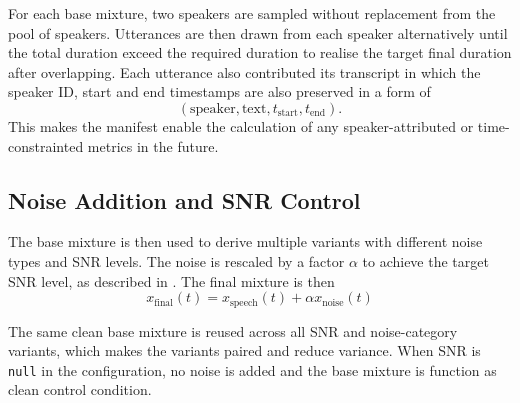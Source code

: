 For each base mixture, two speakers are sampled without replacement from the pool of speakers. Utterances are then drawn from each speaker alternatively until the total duration exceed the required duration to realise the target final duration after overlapping. Each utterance also contributed its transcript in which the speaker ID, start and end timestamps are also preserved in a form of
\begin{equation}
(\text{speaker}, \text{text}, t_{\text{start}}, t_{\text{end}}).
\end{equation}
This makes the manifest enable the calculation of any speaker-attributed or time-constrainted metrics in the future. 
\subsection{Noise Addition and SNR Control}
The base mixture is then used to derive multiple variants with different noise types and SNR levels. The noise is rescaled by a factor $\alpha$ to achieve the target SNR level, as described in . The final mixture is then 
\begin{equation}
x_\mathrm{final}(t) = x_\mathrm{speech}(t)+\alpha x_\mathrm{noise}(t)
\end{equation}

The same clean base mixture is reused across all SNR and noise-category variants, which makes the variants paired and reduce variance. When SNR is \texttt{null} in the configuration, no noise is added and the base mixture is function as clean control condition.

